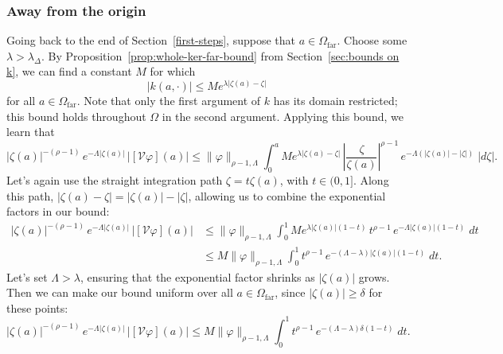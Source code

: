 \documentclass{article}
\theoremstyle{definition}
\theoremstyle{plain}
\newcommand{\volterra}{\mathcal{V}}
\newcommand{\domain}{\Omega}
\newcommand{\far}{\Omega_\text{far}}
\begin{document}
\subsubsection{Away from the origin}\label{far-bound}
Going back to the end of Section~\ref{first-steps}, suppose that $a \in \far$. Choose some $\lambda > \lambda_\Delta$. By Proposition~\ref{prop:whole-ker-far-bound} from Section~\ref{sec:bounds on k}, we can find a constant $M$ for which
\[ |k(a, \cdot)| \le M e^{\lambda |\zeta(a) - \zeta|} \]
for all $a \in \far$. Note that only the first argument of $k$ has its domain restricted; this bound holds throughout $\domain$ in the second argument. Applying this bound, we learn that
\[ |\zeta(a)|^{-(\rho-1)}\,e^{-\Lambda|\zeta(a)|}\,|[\volterra\varphi](a)| \le \|\varphi\|_{\rho-1, \Lambda} \int_0^a M e^{\lambda |\zeta(a) - \zeta|}\,\left|\frac{\zeta}{\zeta(a)}\right|^{\rho-1}\,e^{-\Lambda(|\zeta(a)| - |\zeta|)}\;|d\zeta|. \]
Let's again use the straight integration path $\zeta = t \zeta(a)$, with $t \in (0, 1]$. Along this path, $|\zeta(a) - \zeta| = |\zeta(a)| - |\zeta|$, allowing us to combine the exponential factors in our bound:
\begin{align*}
|\zeta(a)|^{-(\rho-1)}\,e^{-\Lambda|\zeta(a)|}\,|[\volterra\varphi](a)| & \le \|\varphi\|_{\rho-1, \Lambda} \int_0^1 M e^{\lambda |\zeta(a)|(1 - t)}\,t^{\rho-1}\,e^{-\Lambda |\zeta(a)|(1 - t)}\;dt \\
& \le M \|\varphi\|_{\rho-1, \Lambda} \int_0^1 t^{\rho-1}\,e^{-(\Lambda - \lambda)|\zeta(a)|(1 - t)}\;dt.
\end{align*}
Let's set $\Lambda > \lambda$, ensuring that the exponential factor shrinks as $|\zeta(a)|$ grows. Then we can make our bound uniform over all $a \in \far$, since $|\zeta(a)| \ge \delta$ for these points:
\[ |\zeta(a)|^{-(\rho-1)}\,e^{-\Lambda|\zeta(a)|}\,|[\volterra\varphi](a)| \le M \|\varphi\|_{\rho-1, \Lambda} \int_0^1 t^{\rho-1}\,e^{-(\Lambda - \lambda)\delta(1 - t)}\;dt. \]
\end{document}
